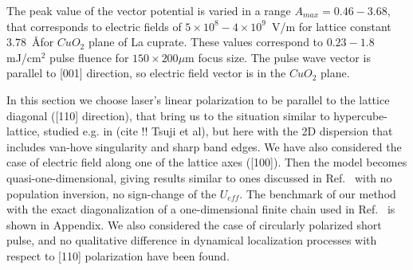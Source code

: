 
The peak value of the vector potential is varied in a range $A_{max} = 0.46 - 3.68$, 
that corresponds to electric fields of $5\times 10^{8} - 4\times 10^{9}$~V/m  for lattice 
constant $3.78$~\AA for $CuO_2$ plane of La cuprate. These values correspond to $0.23 - 1.8$ mJ/cm$^2$ pulse fluence for $150\times 200 \mu$m focus size.  
The pulse wave vector is parallel to [001]  direction, so electric field vector is in the $CuO_2$  plane. 

{\color{red}{@HA As I have emphasized when we discussed in Hamburg, you have to 
characterize the field strength in terms of the Bessel function 
for the renormalized band width as a function of @.  
"Weak" and "strong" fields can be characterized only in terms of that.  
Then you can talk about the renormalized U/W, where W is the renormalized 
bandwidth.}}  
{\color{blue}{@EG, VV we are renormalizing the bandwidth, and the effective U is being changed in the units of renormalized bandwidth, keeping it's "bare" value constant (i.e. it is not changing w.r.t. other characteristic energies of the model, e.g. pulse frequency).}}

In this section we choose laser's linear polarization to be parallel to the lattice diagonal ([110] direction),
that bring us to the situation similar to hypercube-lattice, studied e.g. in (cite !!  Tsuji et al), but here with the 2D dispersion that includes van-hove singularity and sharp band edges.  
We have also considered the case of electric field along 
one of the lattice axes ([100]).   
Then the model becomes quasi-one-dimensional, giving results similar to ones discussed in Ref.~\cite{Rui} with no population inversion, no sign-change of the $U_{eff}$. The benchmark of our method with the exact diagonalization of a one-dimensional finite chain used in Ref.~\cite{Rui} is shown in Appendix. We also considered the case of circularly polarized short pulse, and no qualitative difference in dynamical localization processes  with respect to [110] polarization have been found.
{\color{red}{@HA Really? Hard to understand.  Anyway, you have said that 
you'll have another paper for the circularly polarized light, haven't you?}}
{\color{blue}{@VV All circularly polarized pulses are out of scope of the current paper. }}
 

